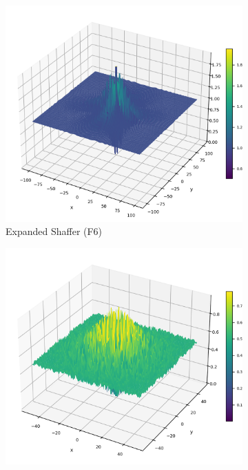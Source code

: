 \begin{figure}[!hb]
\begin{subfigure}{0.32\textwidth}
    \end{subfigure}
    \begin{subfigure}{0.32\textwidth}
        \centering
        \includegraphics[width=1\textwidth]{Figures/benchmark_plots/Expanded_Shaffer_maximized.png}
        \caption{Expanded Shaffer (F6)}
    \end{subfigure}
        \begin{subfigure}{0.32\textwidth}
        \centering
        \includegraphics[width=1\textwidth]{Figures/benchmark_plots/Generalized_Schaffer_N1_maximized.png}

\end{subfigure}
\end{figure}
